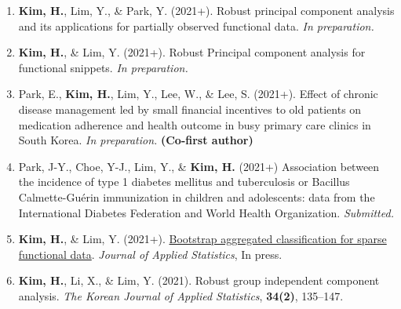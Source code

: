 \documentclass[11pt, a4paper]{awesome-cv} %
\begin{document}

\begin{cventries}
	\begin{enumerate}
		\item {\bf Kim, H.}, Lim, Y., \& Park, Y. (2021+). Robust principal component analysis and its applications for partially observed functional data. {\em In preparation.}	
		\item {\bf Kim, H.}, \& Lim, Y. (2021+). Robust Principal component analysis for functional snippets. {\em In preparation.}	
		\item Park, E., {\bf Kim, H.}, Lim, Y., Lee, W., \& Lee, S.  (2021+). Effect of chronic disease management led by small financial incentives to old patients on medication adherence and health outcome in busy primary care clinics in South Korea. {\em In preparation.} {\bf (Co-first author)}
		
		\item Park, J-Y., Choe, Y-J., Lim, Y., \& {\bf Kim, H.} (2021+) Association between the incidence of type 1 diabetes mellitus and tuberculosis or Bacillus Calmette-Guérin immunization in children and adolescents: data from the International Diabetes Federation and World Health Organization. {\em Submitted.}
		\item {\bf Kim, H.}, \& Lim, Y. (2021+). \href{https://doi.org/10.1080/02664763.2021.1889997}{Bootstrap aggregated classification for sparse functional data}. {\em Journal of Applied Statistics}, In press.
		\item {\bf Kim, H.}, Li, X., \& Lim, Y. (2021). Robust group independent component analysis. {\em The Korean Journal of Applied Statistics}, {\bf 34(2)}, 135–147.
	\end{enumerate}
\end{cventries}

\end{document}
